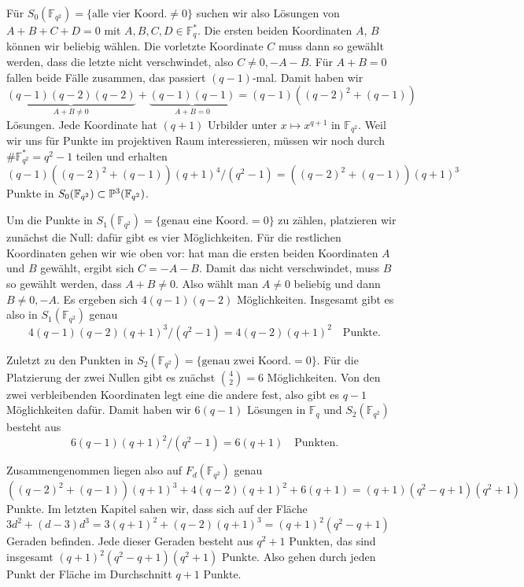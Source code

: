 Für $S_0(\mathbb F_{q^2}) = \{\text{alle vier Koord.}\neq 0\}$ suchen wir also Lösungen von $A+B+C+D=0$ mit $A,B,C,D \in \mathbb F_q^*$. Die ersten beiden Koordinaten $A$, $B$ können wir beliebig wählen. Die vorletzte Koordinate $C$ muss dann so gewählt werden, dass die letzte nicht verschwindet, also $C \neq 0, -A-B$. Für $A+B=0$ fallen beide Fälle zusammen, das passiert $(q-1)$-mal. Damit haben wir
\begin{equation*}
\underbrace{(q-1)(q-2)(q-2)}_{A+B \neq 0} + \underbrace{(q-1)(q-1)}_{A+B=0} = (q-1)((q-2)^2+(q-1))
\end{equation*}
Lösungen. Jede Koordinate hat $(q+1)$ Urbilder unter $x \mapsto x^{q+1}$ in $\mathbb F_{q^2}$. Weil wir uns für Punkte im projektiven Raum interessieren, müssen wir noch durch $\#\mathbb F_{q^2}^* = q^2-1$ teilen und erhalten
\begin{equation}
(q-1)((q-2)^2+(q-1))(q+1)^4/(q^2-1) = ((q-2)^2+(q-1))(q+1)^3
\end{equation}
Punkte in $S_0(\mathbb F_{q^2}) \subset \mathbb P^{3}(\mathbb F_{q^2})$.

Um die Punkte in $S_1(\mathbb F_{q^2}) = \{\text{genau eine Koord.}= 0\}$ zu zählen, platzieren wir zunächst die Null: dafür gibt es vier Möglichkeiten. Für die restlichen Koordinaten gehen wir wie oben vor: hat man die ersten beiden Koordinaten $A$ und $B$ gewählt, ergibt sich $C=-A-B$. Damit das nicht verschwindet, muss $B$ so gewählt werden, dass $A+B \neq 0$. Also wählt man $A \neq 0$ beliebig und dann $B \neq 0, -A$. Es ergeben sich $4(q-1)(q-2)$ Möglichkeiten. Insgesamt gibt es also in $S_1(\mathbb F_{q^2})$ genau
\begin{equation}
4(q-1)(q-2)(q+1)^3/(q^2-1) = 4(q-2)(q+1)^2 \quad\text{Punkte.}
\end{equation}

Zuletzt zu den Punkten in $S_2(\mathbb F_{q^2}) = \{\text{genau zwei Koord.}= 0\}$. Für die Platzierung der zwei Nullen gibt es zuächst $\binom 4 2 = 6$ Möglichkeiten. Von den zwei verbleibenden Koordinaten legt eine die andere fest, also gibt es $q-1$ Möglichkeiten dafür. Damit haben wir $6(q-1)$ Lösungen in $\mathbb F_q$ und $S_2(\mathbb F_{q^2})$ besteht aus
\begin{equation}
6(q-1)(q+1)^2/(q^2-1) = 6(q+1) \quad\text{Punkten.}
\end{equation}

Zusammengenommen liegen also auf $F_d(\mathbb F_{q^2})$ genau
\begin{equation}
((q-2)^2+(q-1))(q+1)^3 + 4(q-2)(q+1)^2 + 6(q+1) = (q+1)(q^2-q+1)(q^2+1)
\end{equation}
Punkte. Im letzten Kapitel sahen wir, dass sich auf der Fläche $3d^2 + (d-3)d^3 = 3(q+1)^2 + (q-2)(q+1)^3 = (q+1)^2(q^2-q+1)$ Geraden befinden. Jede dieser Geraden besteht aus $q^2+1$ Punkten, das sind insgesamt $(q+1)^2(q^2-q+1)(q^2+1)$ Punkte. Also gehen durch jeden Punkt der Fläche im Durchschnitt $q+1$ Punkte.

